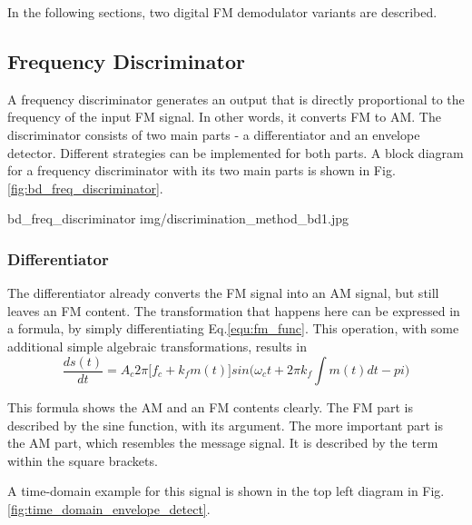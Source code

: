 
In the following sections, two digital FM demodulator variants are described.


\subsection{Frequency Discriminator}

A frequency discriminator generates an output that is directly proportional to the frequency of the input FM signal.
In other words, it converts FM to AM.
The discriminator consists of two main parts - a differentiator and an envelope detector.
Different strategies can be implemented for both parts.
A block diagram for a frequency discriminator with its two main parts is shown in Fig.\ref{fig:bd_freq_discriminator}.

 {bd_freq_discriminator} {img/discrimination_method_bd1.jpg}

\subsubsection{Differentiator}

The differentiator already converts the FM signal into an AM signal, but still leaves an FM content.
The transformation that happens here can be expressed in a formula, by simply differentiating Eq.\eqref{equ:fm_func}.
This operation, with some additional simple algebraic transformations, results in
\begin{equation}
  \frac{d s(t)}{dt} = A_c 2 \pi \Big[f_c + k_f m(t) \Big] sin \Big(\omega_c t + 2 \pi k_f \int m(t) dt -pi \Big)
  \label{equ:fm_demod_discriminator}
\end{equation}

This formula shows the AM and an FM contents clearly.
The FM part is described by the sine function, with its argument.
The more important part is the AM part, which resembles the message signal.
It is described by the term within the square brackets.

A time-domain example for this signal is shown in the top left diagram in Fig.\ref{fig:time_domain_envelope_detect}.\\

